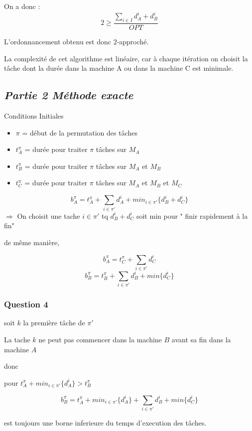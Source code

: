 On a donc : \[2 \geq \frac{\sum_{i \in I}d_A^i + d_B^i}{OPT}\]

L'ordonnancement obtenu est donc 2-approché.

La complexité de cet algorithme est linéaire, car à chaque itération on
choisit la tâche dont la durée dans la machine A ou dans la machine C
est minimale.

\subsection{\texorpdfstring{\emph{Partie 2 Méthode
exacte}}{Partie 2 Méthode exacte}}\label{partie-2-muxe9thode-exacte}

Conditions Initiales

\begin{itemize}
\itemsep1pt\parskip0pt
\item
  \(\pi\) = début de la permutation des tâches
\item
  \(t_A^\pi\) = durée pour traiter \(\pi\) tâches sur \(M_A\)
\item
  \(t_B^\pi\) = durée pour traiter \(\pi\) tâches sur \(M_A\) et \(M_B\)
\item
  \(t_C^\pi\) = durée pour traiter \(\pi\) tâches sur \(M_A\) et \(M_B\)
  et \(M_C\)
\end{itemize}

\[ b_A^\pi = t_A^\pi + \sum_{i \in \pi' }d_A^i + min_{i \in \pi'}\{d_B^i + d_C^i\} \]
\(\Rightarrow\) On choisit une tache \(i \in \pi'\) tq \(d_B^i + d_C^i\)
soit min pour " finir rapidement à la fin"

de même manière,

\[b_A^\pi = t_C^\pi + \sum_{ i \in \pi'}d_C^i \]
\[b_B^\pi = t_B^\pi + \sum_{i \in \pi'}d_B^i + min\{d_C^i\}\]

\subsubsection{Question 4}\label{question-4}

soit \(k\) la première tâche de \(\pi'\)

La tache \(k\) ne peut pas commencer dans la machine \(B\) avant sa fin
dans la machine \(A\)

donc

pour \(t_A^\pi + min_{i \in \pi'} \{d_A^i\} > t_B^\pi\)

\[b_B^\pi = t_A^\pi + min_{i \in\pi'} \{d_A^i\}  + \sum_{i \in \pi'}d_B^i + min\{d_C^i\}\]

est toujours une borne inferieure du temps d'execution des tâches.

